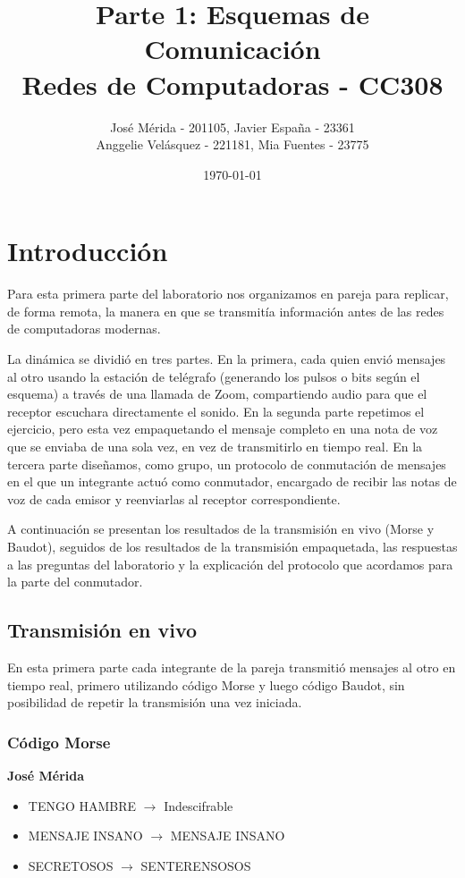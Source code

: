 \documentclass[11pt]{article}
\title{\textbf{Parte 1: Esquemas de Comunicación} \vspace{1em}\\
  Redes de Computadoras - CC308}
\author{José Mérida - 201105, Javier España - 23361 \\
  Anggelie Velásquez - 221181, Mia Fuentes - 23775}
\date{\today}
\begin{document}
\maketitle
\section*{Introducción}

Para esta primera parte del laboratorio nos organizamos en pareja para replicar, de forma remota, la manera en
que se transmitía información antes de las redes de computadoras modernas.

La dinámica se dividió en tres partes. En la primera, cada quien envió mensajes al otro usando
la estación de telégrafo (generando los pulsos o bits según el esquema) a través de una llamada de Zoom, compartiendo audio
para que el receptor escuchara directamente el sonido. En la segunda parte repetimos el ejercicio, pero esta vez empaquetando
el mensaje completo en una nota de voz que se enviaba de una sola vez, en vez de transmitirlo en tiempo real. En la tercera parte
diseñamos, como grupo, un protocolo de conmutación de mensajes en el que un integrante actuó como conmutador, encargado
de recibir las notas de voz de cada emisor y reenviarlas al receptor correspondiente.

A continuación se presentan los resultados de la transmisión en vivo (Morse y Baudot), seguidos de los resultados
de la transmisión empaquetada, las respuestas a las preguntas del laboratorio y la explicación del protocolo
que acordamos para la parte del conmutador.

\subsection*{Transmisión en vivo}

En esta primera parte cada integrante de la pareja transmitió mensajes al otro en tiempo real, primero utilizando código Morse y luego código Baudot, sin posibilidad de repetir la transmisión una vez iniciada.

\subsubsection*{Código Morse}

\textbf{José Mérida}
\begin{itemize}[nosep]
  \item TENGO HAMBRE $\rightarrow$ Indescifrable
  \item MENSAJE INSANO $\rightarrow$ MENSAJE INSANO
  \item SECRETOSOS $\rightarrow$ SENTERENSOSOS
\end{itemize}
\end{document}
